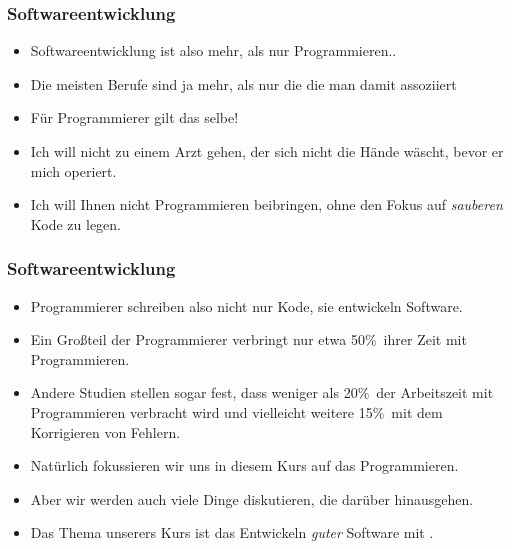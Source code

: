 \documentclass[aspectratio=169,mathserif,notheorems]{beamer}%
\begin{document}
\begin{frame}%
\frametitle{Softwareentwicklung}%
\begin{itemize}%
\item Softwareentwicklung ist also mehr, als nur Programmieren..%
\item<2-> Die meisten Berufe sind ja mehr, als nur die  die man damit assoziiert%
\item<6-> Für Programmierer gilt das selbe!%
\item<10-> Ich will nicht zu einem Arzt gehen, der sich nicht die Hände wäscht, bevor er mich operiert.%
\item<11-> Ich will Ihnen nicht Programmieren beibringen, ohne den Fokus auf \emph{sauberen} Kode zu legen.%
\end{itemize}%
\end{frame}%
%
\begin{frame}%
\frametitle{Softwareentwicklung}%
%
\begin{itemize}%
\item Programmierer schreiben also nicht nur Kode, sie entwickeln Software.%
\item<2-> Ein Großteil der Programmierer verbringt nur etwa 50\%~ihrer Zeit mit Programmieren\cite{T2019MOSWBFDHOT2TMOSS,AS2019DS2OSRP}.%
\item<3-> Andere Studien stellen sogar fest, dass weniger als 20\%~der Arbeitszeit mit Programmieren verbracht wird und vielleicht weitere 15\%~mit dem Korrigieren von Fehlern\cite{MAGTOC2024EHFAP}.%
%
\item<4-> Natürlich fokussieren wir uns in diesem Kurs auf das Programmieren.%
%
\item<5-> Aber wir werden auch viele Dinge diskutieren, die darüber hinausgehen.
%
\item<8-> Das Thema unserers Kurs ist das Entwickeln \emph{guter} Software mit \python.%
\end{itemize}%
\end{frame}%
%
%
\end{document}
